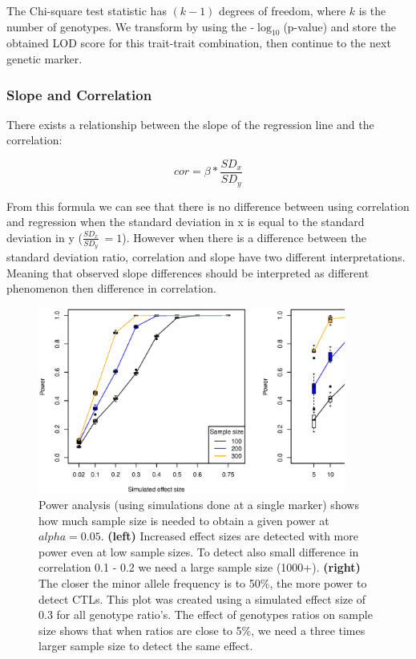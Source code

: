   The Chi-square test statistic has $(k-1)$ degrees of freedom, where $k$ is the number of genotypes. We transform by 
  using the -$\log_{10}$(p-value) and store the obtained LOD score for this trait-trait combination, then continue to 
  the next genetic marker.

  \subsubsection{Slope and Correlation}

  There exists a relationship between the slope of the regression line and the correlation:

  $$ cor = \beta * \frac{SD_{x}}{SD_{y}}$$

  From this formula we can see that there is no difference between using correlation and regression when the standard 
  deviation in x is equal to the standard deviation in y ($\frac{SD_{x}}{SD_{y}} ~= 1$). However when there is a 
  difference between the standard deviation ratio, correlation and slope have two different interpretations. Meaning 
  that observed slope differences should be interpreted as different phenomenon then difference in correlation.

  \begin{figure}[h!]
  \centering
  \includegraphics[width=0.9\textwidth]{eps/image_4_2.eps}
  \caption[Power analysis.]{Power analysis (using simulations done at a single marker) shows how 
                            much sample size is needed to obtain a given power at $alpha = 0.05$.\newline 
                            {\bf(left)} Increased effect sizes are detected with more power even at 
                            low sample sizes. To detect also small difference in correlation 
                            0.1 - 0.2 we need a large sample size (1000+).\newline
                            {\bf(right)} The closer the minor allele frequency is to 50\%, the more 
                            power to detect CTLs. This plot was created using a simulated effect size 
                            of 0.3 for all genotype ratio's. The effect of genotypes ratios on sample 
                            size shows that when ratios are close to 5\%, we need a three times larger 
                            sample size to detect the same effect. }
          \label{fig:fig4_2}
  \end{figure}


